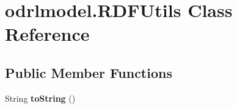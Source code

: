 \hypertarget{classodrlmodel_1_1_r_d_f_utils}{\section{odrlmodel.\-R\-D\-F\-Utils Class Reference}
\label{classodrlmodel_1_1_r_d_f_utils}
}
\subsection*{Public Member Functions}
\begin{DoxyCompactItemize}
\item 
\hypertarget{classodrlmodel_1_1_r_d_f_utils_af022181a14e893d47069a2c000610ac3}{String {\bfseries to\-String} ()}\label{classodrlmodel_1_1_r_d_f_utils_af022181a14e893d47069a2c000610ac3}

\end{DoxyCompactItemize}
